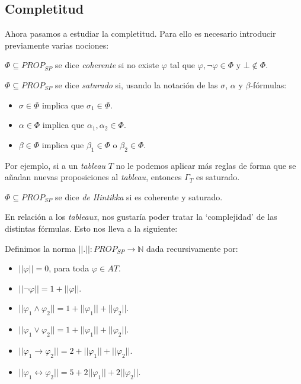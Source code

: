 \subsection{Completitud}

Ahora pasamos a estudiar la completitud. Para ello es necesario introducir previamente varias nociones:

\begin{definition}
$\Phi \subseteq PROP_{SP}$ se dice \textit{coherente} si no existe $\varphi$ tal que $\varphi, \neg \varphi \in \Phi$ y $\bot \notin \Phi$.
\end{definition}

\begin{definition}
$\Phi \subseteq PROP_{SP}$ se dice \textit{saturado} si, usando la notación de las $\sigma$, $\alpha$ y $\beta$-fórmulas:
\begin{itemize}
    \item $\sigma \in \Phi$ implica que $\sigma_1 \in \Phi$.
    \item $\alpha \in \Phi$ implica que $\alpha_1, \alpha_2 \in \Phi$.
    \item $\beta \in \Phi$ implica que $\beta_1 \in \Phi$ o $\beta_2 \in \Phi$.
\end{itemize}
Por ejemplo, si a un \textit{tableau} $T$ no le podemos aplicar más reglas de forma que se añadan nuevas proposiciones al \textit{tableau}, entonces $\Gamma_T$ es saturado.
\end{definition}

\begin{definition}
$\Phi \subseteq PROP_{SP}$ se dice \textit{de Hintikka} si es coherente y saturado.
\end{definition}

En relación a los \textit{tableaux}, nos gustaría poder tratar la `complejidad' de las distintas fórmulas. Esto nos lleva a la siguiente:

\begin{definition}
Definimos la norma $||.||: PROP_{SP} \rightarrow \mathbb{N}$ dada recursivamente por:
\begin{itemize}
    \item $||\varphi|| = 0$, para toda $\varphi \in AT$.
    \item $||\neg \varphi|| = 1 + ||\varphi||$.
    \item $||\varphi_1 \land \varphi_2|| = 1 + ||\varphi_1|| + ||\varphi_2||$.
    \item $||\varphi_1 \lor \varphi_2|| = 1 + ||\varphi_1|| + ||\varphi_2||$.
    \item $||\varphi_1 \rightarrow \varphi_2|| = 2 + ||\varphi_1|| + ||\varphi_2||$.
    \item $||\varphi_1 \leftrightarrow \varphi_2|| = 5 + 2||\varphi_1|| + 2||\varphi_2||$.
\end{itemize}
\end{definition}

